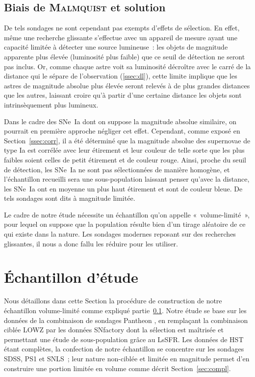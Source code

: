 \documentclass[../main/main.tex]{subfiles}
\begin{document}
\subsection{Biais de \textsc{Malmquist} et solution}\label{ssec:malm}

De tels sondages ne sont cependant pas exempts d'effets de sélection. En effet,
même une recherche glissante s'effectue avec un appareil de mesure ayant une
capacité limitée à détecter une source lumineuse~: les objets de magnitude
apparente plus élevée (luminosité plus faible) que ce seuil de détection ne
seront pas inclus. Or, comme chaque astre voit sa luminosité décroître avec le
carré de la distance qui le sépare de l'observation (\ref{ssec:dl}), cette
limite implique que les astres de magnitude absolue plus élevée seront relevés à
de plus grandes distances que les autres, laissant croire qu'à partir d'une
certaine distance les objets sont intrinsèquement plus lumineux.

Dans le cadre des SNe~Ia dont on suppose la magnitude absolue similaire, on
pourrait en première approche négliger cet effet. Cependant, comme exposé en
Section~\ref{ssec:corr}, il a été déterminé que la magnitude absolue des
supernovae de type Ia est corrélée avec leur étirement et leur couleur de
telle sorte que les plus faibles soient celles de petit étirement et de couleur
rouge. Ainsi, proche du seuil de détection, les SNe~Ia ne sont pas sélectionnées
de manière homogène, et l'échantillon recueilli sera une sous-population
laissant penser qu'avec la distance, les SNe~Ia ont en moyenne un plus haut
étirement et sont de couleur bleue. De tels sondages sont dits à magnitude
limitée.

Le cadre de notre étude nécessite un échantillon qu'on appelle
«~volume-limité~», pour lequel on suppose que la population résulte bien d'un
tirage aléatoire de ce qui existe dans la nature. Les sondages modernes reposant
sur des recherches glissantes, il nous a donc fallu les réduire pour les
utiliser.

\section{Échantillon d'étude}\label{sec:sample}

Nous détaillons dans cette Section la procédure de construction de notre
échantillon volume-limité comme expliqué partie~\ref{ssec:malm}. Notre étude se
base sur les données de la combinaison de sondages Pantheon \citep{scolnic2018},
en remplaçant la combinaison ciblée LOWZ par les données SNfactory dont la
sélection est maîtrisée et permettant une étude de sous-population grâce au
LsSFR. Les données de HST étant complètes, la confection de notre échantillon se
concentre sur les sondages SDSS, PS1 et SNLS~; leur nature non-ciblée et limitée
en magnitude permet d'en construire une portion limitée en volume comme décrit
Section~\ref{sec:compl}.
\end{document}
